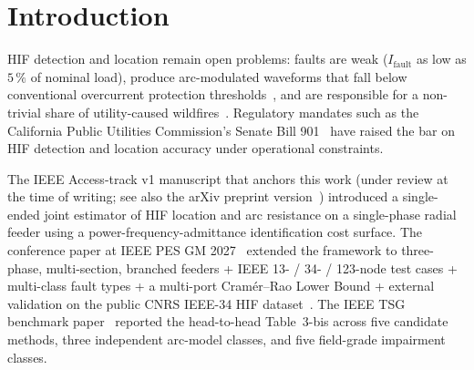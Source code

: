 \documentclass[journal]{IEEEtran}
\begin{document}
\section{Introduction}\label{sec:intro}
HIF detection and location remain open problems: faults are
weak ($I_\mathrm{fault}$ as low as $5\,\%$ of nominal load),
produce arc-modulated waveforms that fall below conventional
overcurrent protection thresholds~\cite{PSRC1996D15,
AucoinRussell1987TPWRD}, and are responsible for a non-trivial
share of utility-caused wildfires~\cite{NREL2023TP5R0080746,
CampFire2018PGE,BlackSaturday2009RoyalCommission}.  Regulatory
mandates such as the California Public Utilities Commission's
Senate Bill 901~\cite{CPUC2018SB901} have raised the bar on
HIF detection and location accuracy under operational
constraints.

The IEEE Access-track v1 manuscript that anchors this work
(under review at the time of writing; see also the arXiv
preprint version~\cite{ArXiv2510_00831}) introduced a single-
ended joint estimator of HIF location and arc resistance on a
single-phase radial feeder using a power-frequency-admittance
identification cost surface.  The conference paper at IEEE PES
GM 2027~\cite{Phase3conf2027} extended the framework to three-
phase, multi-section, branched feeders + IEEE 13- / 34- / 123-node
test cases + multi-class fault types + a multi-port Cram\'er--Rao
Lower Bound + external validation on the public CNRS IEEE-34
HIF dataset~\cite{CNRS_2024_IEEE34}.  The IEEE TSG benchmark
paper~\cite{Phase4tsg2027} reported the head-to-head Table~3-bis
across five candidate methods, three independent arc-model
classes, and five field-grade impairment classes.
\end{document}
